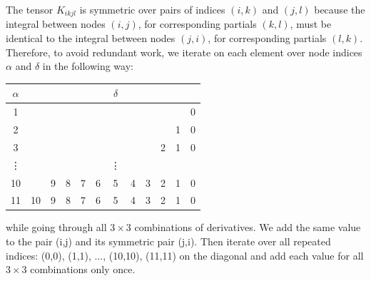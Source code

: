    The tensor $K_{ikjl}$ is symmetric over pairs of indices $(i,k)$ and $(j,l)$ because the integral between nodes $(i,j)$, for corresponding partials $(k,l)$, must be identical to the integral between nodes $(j,i)$, for corresponding partials $(l,k)$. Therefore, to avoid redundant work, we iterate on each element over node indices $\alpha$ and $\delta$ in the following way:

   \begin{longtable}{c|ccccccccccc}
      $\alpha$ & \hspace{6mm} & \hspace{6mm} & \hspace{6mm} & \hspace{6mm} & \hspace{6mm} & \hspace{1.3mm} $\delta$ \hspace{1.3mm} & \hspace{6mm} & \hspace{6mm} & \hspace{6mm} & \hspace{6mm} & \hspace{6mm} \\
      \hline
      1  &    &   &   &   &   &   &   &   &   &   & 0 \\
      2  &    &   &   &   &   &   &   &   &   & 1 & 0 \\
      3  &    &   &   &   &   &   &   &   & 2 & 1 & 0 \\
      \vdots&&  &   &   &   &\vdots&   &   &   &   &  \\
      10 &    & 9 & 8 & 7 & 6 & 5 & 4 & 3 & 2 & 1 & 0 \\
      11 & 10 & 9 & 8 & 7 & 6 & 5 & 4 & 3 & 2 & 1 & 0
   \end{longtable}
   
   while going through all $3 \times 3$ combinations of derivatives. We add the same value to the pair (i,j) and its symmetric pair (j,i). Then iterate over all repeated indices: (0,0), (1,1), ..., (10,10), (11,11) on the diagonal and add each value for all $3 \times 3$ combinations only once.

